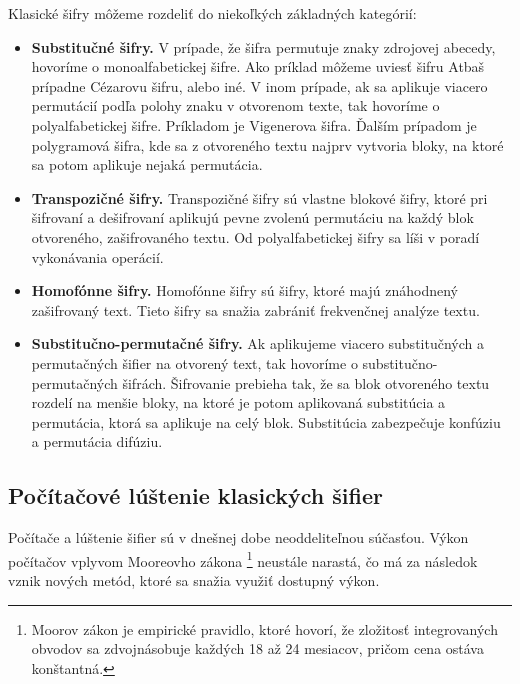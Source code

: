 Klasické šifry môžeme rozdeliť do niekoľkých základných kategórií:
\begin{itemize}

\item \textbf{Substitučné šifry.}
  V prípade, že šifra permutuje znaky zdrojovej abecedy, hovoríme o monoalfabetickej šifre.
  Ako príklad môžeme uviesť šifru Atbaš prípadne Cézarovu šifru, alebo iné.
  V inom prípade, ak sa aplikuje viacero permutácií podľa polohy znaku v otvorenom texte, tak hovoríme o polyalfabetickej šifre.
  Príkladom je Vigenerova šifra. Ďalším prípadom je polygramová šifra, kde sa z otvoreného textu najprv vytvoria bloky,
  na ktoré sa potom aplikuje nejaká permutácia.

\item \textbf{Transpozičné šifry.}
  Transpozičné šifry sú vlastne blokové šifry, ktoré pri šifrovaní a dešifrovaní aplikujú pevne zvolenú permutáciu na každý blok
  otvoreného, zašifrovaného textu. Od polyalfabetickej šifry sa líši v poradí vykonávania operácií.
  
\item \textbf{Homofónne šifry.}
  Homofónne šifry sú šifry, ktoré majú znáhodnený zašifrovaný text. Tieto šifry sa snažia zabrániť frekvenčnej analýze textu. 
  
\item \textbf{Substitučno-permutačné šifry.}
  Ak aplikujeme viacero substitučných a permutačných šifier na otvorený text, tak hovoríme o substitučno-permutačných šifrách.
  Šifrovanie prebieha tak, že sa blok otvoreného textu rozdelí na menšie bloky, na ktoré je potom aplikovaná substitúcia a permutácia,
  ktorá sa aplikuje na celý blok. Substitúcia zabezpečuje konfúziu a permutácia difúziu.
  
\end{itemize}

\subsection{Počítačové lúštenie klasických šifier}
Počítače a lúštenie šifier sú v dnešnej dobe neoddeliteľnou súčasťou. Výkon počítačov vplyvom Mooreovho zákona \footnote{Moorov zákon je empirické pravidlo, ktoré hovorí, že zložitosť integrovaných obvodov sa zdvojnásobuje každých 18 až 24 mesiacov, pričom cena ostáva konštantná.} neustále narastá,
čo má za následok vznik nových metód, ktoré sa snažia využiť dostupný výkon.

